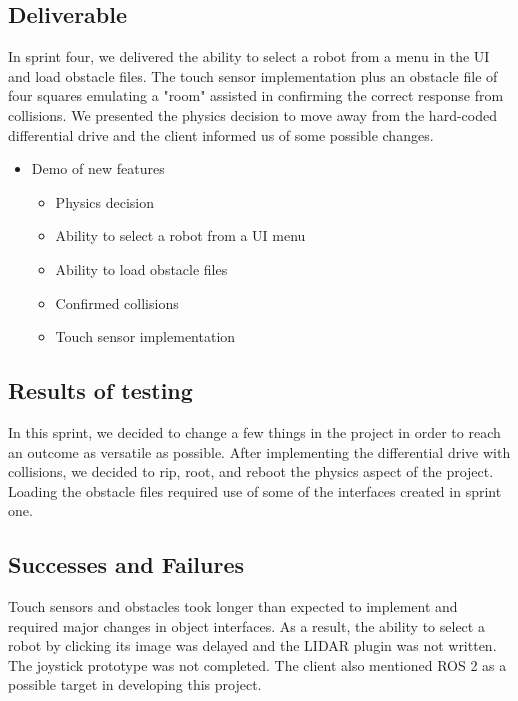 \subsection{Deliverable}

In sprint four, we delivered the ability to select a robot from a menu in the UI and load obstacle files. The touch sensor implementation plus an obstacle file of four squares emulating a "room" assisted in confirming the correct response from collisions. We presented the physics decision to move away from the hard-coded differential drive and the client informed us of some possible changes.

\begin{itemize}
	\item Demo of new features
	\begin{itemize}
		\item Physics decision
		\item Ability to select a robot from a UI menu
		\item Ability to load obstacle files
		\item Confirmed collisions
		\item Touch sensor implementation
	\end{itemize}
\end{itemize}

\subsection{Results of testing}

In this sprint, we decided to change a few things in the project in order to reach an outcome as versatile as possible. After implementing the differential drive with collisions, we decided to rip, root, and reboot the physics aspect of the project. Loading the obstacle files required use of some of the interfaces created in sprint one.

\subsection{Successes and Failures}

Touch sensors and obstacles took longer than expected to implement and required major changes in object interfaces. As a result, the ability to select a robot by clicking its image was delayed and the LIDAR plugin was not written. The joystick prototype was not completed. The client also mentioned ROS 2 as a possible target in developing this project.

